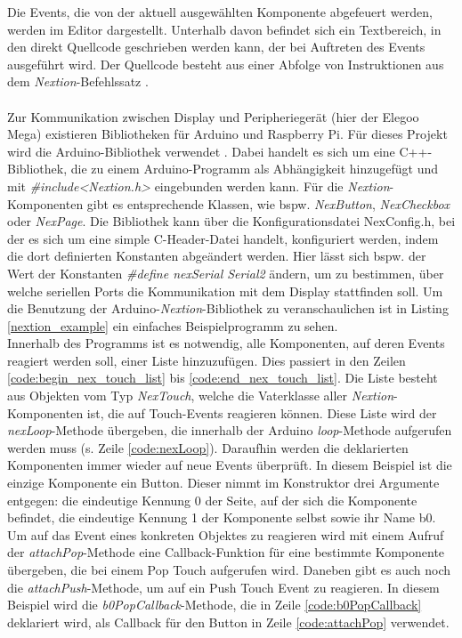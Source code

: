 \noindent
Die Events, die von der aktuell ausgewählten Komponente abgefeuert werden, werden im Editor dargestellt. Unterhalb davon befindet sich ein Textbereich, in den direkt Quellcode geschrieben werden kann, der bei Auftreten des Events ausgeführt wird. Der Quellcode besteht aus einer Abfolge von Instruktionen aus dem \textit{Nextion}-Befehlssatz \cite{nextion_instructions}.\\\\
Zur Kommunikation zwischen Display und Peripheriegerät (hier der Elegoo Mega) existieren Bibliotheken für Arduino und Raspberry Pi. Für dieses Projekt wird die Arduino-Bibliothek verwendet \cite{nextion_library}. Dabei handelt es sich um eine C++-Bibliothek, die zu einem Arduino-Programm als Abhängigkeit hinzugefügt und mit \textit{\#include<Nextion.h>} eingebunden werden kann. Für die \textit{Nextion}-Komponenten gibt es entsprechende Klassen, wie bspw. \textit{NexButton}, \textit{NexCheckbox} oder \textit{NexPage}. Die Bibliothek kann über die Konfigurationsdatei \glqq{}NexConfig.h\grqq{}, bei der es sich um eine simple C-Header-Datei handelt, konfiguriert werden, indem die dort definierten Konstanten abgeändert werden. Hier lässt sich bspw. der Wert der Konstanten \textit{\#define nexSerial Serial2} ändern, um zu bestimmen, über welche seriellen Ports die Kommunikation mit dem Display stattfinden soll. Um die Benutzung der Arduino-\textit{Nextion}-Bibliothek zu veranschaulichen ist in Listing \ref{nextion_example} ein einfaches Beispielprogramm zu sehen.\\

Innerhalb des Programms ist es notwendig, alle Komponenten, auf deren Events reagiert werden soll, einer Liste hinzuzufügen. Dies passiert in den Zeilen \ref{code:begin_nex_touch_list} bis \ref{code:end_nex_touch_list}. Die Liste besteht aus Objekten vom Typ \textit{NexTouch}, welche die Vaterklasse aller \textit{Nextion}-Komponenten ist, die auf Touch-Events reagieren können. Diese Liste wird der \textit{nexLoop}-Methode übergeben, die innerhalb der Arduino \textit{loop}-Methode aufgerufen werden muss (s. Zeile \ref{code:nexLoop}). Daraufhin werden die deklarierten Komponenten immer wieder auf neue Events überprüft. In diesem Beispiel ist die einzige Komponente ein Button. Dieser nimmt im Konstruktor drei Argumente entgegen: die eindeutige Kennung \glqq{}0\grqq{} der Seite, auf der sich die Komponente befindet, die eindeutige Kennung \glqq{}1\grqq{} der Komponente selbst sowie ihr Name \glqq{}b0\grqq{}. Um auf das Event eines konkreten Objektes zu reagieren wird mit einem Aufruf der \textit{attachPop}-Methode eine Callback-Funktion für eine bestimmte Komponente übergeben, die bei einem \glqq{}Pop Touch\grqq{} aufgerufen wird. Daneben gibt es auch noch die \textit{attachPush}-Methode, um auf ein \glqq{}Push Touch\grqq{} Event zu reagieren. In diesem Beispiel wird die \textit{b0PopCallback}-Methode, die in Zeile \ref{code:b0PopCallback} deklariert wird, als Callback für den Button in Zeile \ref{code:attachPop} verwendet.
